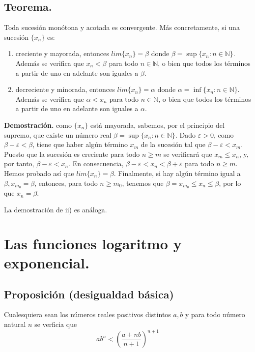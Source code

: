 \documentclass[10pt,a4paper]{article}
\begin{document}
	\subsection{Teorema.} Toda sucesión monótona y acotada es convergente. Más concretamente, si una sucesión $\{x_n\}$ es:
	\begin{enumerate}[label=\roman*)]
		\item creciente y mayorada, entonces $lim\{x_n\} = \beta$ donde $\beta = \sup\{x_n: n \in \mathbb{N}\}$. Además se verifica que $x_n < \beta$ para todo $n \in \mathbb{N}$, o bien que todos los términos a partir de uno en adelante son iguales a $\beta$. 
		\item decreciente y minorada, entonces $lim\{x_n\} = \alpha$ donde $\alpha = \inf\{x_n: n \in \mathbb{N}\}$. Además se verifica que $\alpha < x_n$ para todo $n \in \mathbb{N}$, o bien que todos los términos a partir de uno en adelante son iguales a $\alpha$.
	\end{enumerate}
	\textbf{Demostración.} como $\{x_n\}$ está mayorada, sabemos, por el principio del supremo, que existe un número real $\beta = \sup\{x_n: n \in \mathbb{N}\}$. Dado $\varepsilon > 0$, como $\beta - \varepsilon < \beta$, tiene que haber algún término $x_m$ de la sucesión tal que $\beta - \varepsilon < x_m$. Puesto que la sucesión es creciente para todo $n \geq m$ se verificará que $x_m \leq x_n$, y, por tanto, $\beta - \varepsilon < x_n$. En consecuencia, $\beta - \varepsilon < x_n < \beta + \varepsilon$ para todo $n \geq m$. Hemos probado así que $lim\{x_n\} = \beta$. Finalmente, si hay algún término igual a $\beta, x_{m_0} = \beta$, entonces, para todo $n \geq m_0$, tenemos que $\beta = x_{m_0} \leq x_n \leq \beta$, por lo que $x_n = \beta$.
	
	La demostración de ii) es análoga.
	
	\newpage
	
	\section{Las funciones logaritmo y exponencial.}
	
	\subsection{Proposición (desigualdad básica)}
	
	Cualesquiera sean los números reales positivos distintos $a, b$ y para todo número natural $n$ se verficia que $$ ab^n < \left(\dfrac{a+nb}{n+1} \right) ^{n+1}$$
	
\end{document}
